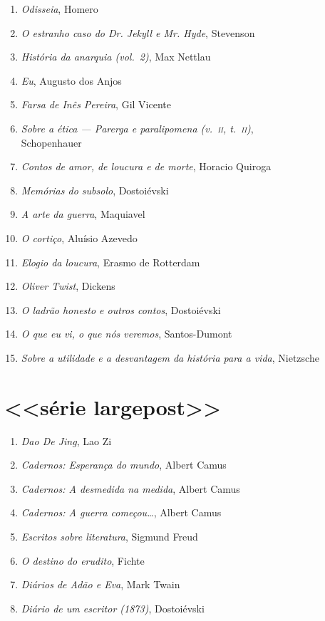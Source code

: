 \begin{enumerate}
\item \textit{Odisseia}, Homero
\item \textit{O estranho caso do Dr. Jekyll e Mr. Hyde}, Stevenson
\item \textit{História da anarquia (vol.~2)}, Max Nettlau
\item \textit{Eu}, Augusto dos Anjos
\item \textit{Farsa de Inês Pereira}, Gil Vicente
\item \textit{Sobre a ética --- Parerga e paralipomena (v.~\textsc{ii}, t.~\textsc{ii})},\\ Schopenhauer 
\item \textit{Contos de amor, de loucura e de morte}, Horacio Quiroga
\item \textit{Memórias do subsolo}, Dostoiévski
\item \textit{A arte da guerra}, Maquiavel
\item \textit{O cortiço}, Aluísio Azevedo
\item \textit{Elogio da loucura}, Erasmo de Rotterdam
\item \textit{Oliver Twist}, Dickens
\item \textit{O ladrão honesto e outros contos}, Dostoiévski
\item \textit{O que eu vi, o que nós veremos}, Santos-Dumont
\item \textit{Sobre a utilidade e a desvantagem da história para a vida}, Nietzsche
\end{enumerate}\medskip


\section{<<série largepost>>}

\begin{enumerate}
\setlength\parskip{4.2pt}
\setlength\itemsep{-1.4mm}
\item \textit{Dao De Jing}, Lao Zi
\item \textit{Cadernos: Esperança do mundo}, Albert Camus
\item \textit{Cadernos: A desmedida na medida}, Albert Camus
\item \textit{Cadernos: A guerra começou\ldots}, Albert Camus
\item \textit{Escritos sobre literatura}, Sigmund Freud
\item \textit{O destino do erudito}, Fichte
\item \textit{Diários de Adão e Eva}, Mark Twain
\item \textit{Diário de um escritor (1873)}, Dostoiévski
\end{enumerate}


